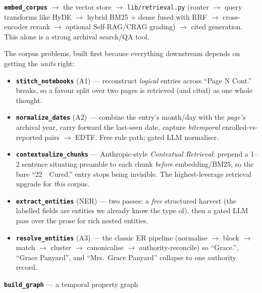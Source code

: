 \documentclass[11pt]{article}
\newcommand{\code}[1]{\texttt{#1}}
\newcommand{\stage}[1]{\textbf{\texttt{#1}}}
\begin{document}
\begin{description}[leftmargin=0pt, itemsep=4pt]
  \item[Tier 0 --- solid RAG.] \stage{embed\_corpus} $\rightarrow$ the vector store $\rightarrow$
        \code{lib/retrieval.py} (router $\rightarrow$ query transforms like HyDE $\rightarrow$ hybrid
        BM25 + dense fused with RRF $\rightarrow$ cross-encoder rerank $\rightarrow$ optional
        Self-RAG/CRAG grading) $\rightarrow$ cited generation. This alone is a strong archival
        search/QA tool.
  \item[Tier 1 --- structural truth.] The corpus problems, built first because everything downstream
        depends on getting the \emph{units} right:
        \begin{itemize}[leftmargin=1.2em, itemsep=1pt]
          \item \stage{stitch\_notebooks} (A1) --- reconstruct \emph{logical} entries across
                ``Page N Cont.'' breaks, so a favour split over two pages is retrieved (and cited) as
                one whole thought.
          \item \stage{normalize\_dates} (A2) --- combine the entry's month/day with the \emph{page's}
                archival year, carry forward the last-seen date, capture \emph{bitemporal}
                enrolled-vs-reported pairs $\rightarrow$ EDTF. Free rule path; gated LLM normaliser.
          \item \stage{contextualize\_chunks} --- Anthropic-style \emph{Contextual Retrieval}: prepend
                a 1--2 sentence situating preamble to each chunk \emph{before} embedding/BM25, so the
                bare ``22\ \ Cured.'' entry stops being invisible. The highest-leverage retrieval
                upgrade for \emph{this} corpus.
          \item \stage{extract\_entities} (NER) --- two passes: a \emph{free} structured harvest (the
                labelled fields are entities we already know the type of), then a gated LLM pass over
                the prose for rich nested entities.
          \item \stage{resolve\_entities} (A3) --- the classic ER pipeline (normalise $\rightarrow$
                block $\rightarrow$ match $\rightarrow$ cluster $\rightarrow$ canonicalise
                $\rightarrow$ authority-reconcile) so ``Grace.'', ``Grace Panyard'', and ``Mrs.\ Grace
                Panyard'' collapse to one authority record.
        \end{itemize}
  \item[Tier 2 --- knowledge graph + GraphRAG.] \stage{build\_graph} --- a temporal property graph

\end{description}
\end{document}
